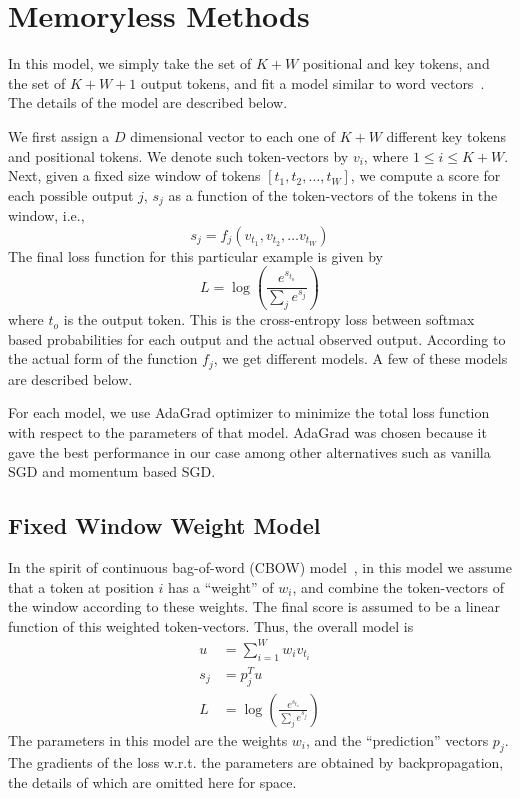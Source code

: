 \section{Memoryless Methods}
\label{sec:memoryless}

\noindent
In this model, we simply take the set of $K+W$ positional and key tokens, and
the set of $K+W+1$ output tokens, and fit a model similar to word
vectors~\cite{ref:mikolov:wvec}. The details of the model are described below.

We first assign a $D$ dimensional vector to each one of $K+W$ different key
tokens and positional tokens. We denote such token-vectors by $v_i$, where $1
\leq i \leq K+W$. Next, given a fixed size window of tokens $[t_1, t_2, \ldots,
t_W]$, we compute a score for each possible output $j$, $s_j$ as a function of
the token-vectors of the tokens in the window, i.e.,
\[
s_j = f_j\left(v_{t_1}, v_{t_2}, \ldots v_{t_W}\right)
\]
The final loss function for this particular example is given by 
\[
L = \log\left(\frac{e^{s_{t_o}}}{\sum_j{e^{s_j}}}\right)
\]
where $t_o$ is the output token. This is the cross-entropy loss
between softmax based probabilities for each output and the actual observed
output. According to the actual form of the function $f_j$, we get different
models. A few of these models are described below.

For each model, we use {\sc AdaGrad} optimizer to minimize the total loss
function with respect to the parameters of that model. {\sc AdaGrad} was chosen
because it gave the best performance in our case among other alternatives such
as vanilla SGD and momentum based SGD.

\subsection{Fixed Window Weight Model}
In the spirit of continuous bag-of-word (CBOW) model~\cite{ref:mikolov:wvec}, in
this model we assume that a token at position $i$ has a ``weight'' of $w_i$, and
combine the token-vectors of the window according to these weights. The final
score is assumed to be a linear function of this weighted token-vectors. Thus,
the overall model is
\begin{align}
u &= \sum_{i=1}^{W}{w_i v_{t_i}}\\
s_j &= p_j^Tu\\
L &= \log\left(\frac{e^{s_{t_o}}}{\sum_j{e^{s_j}}}\right)
\end{align}
The parameters in this model are the weights $w_i$, and the ``prediction''
vectors $p_j$. The gradients of the loss w.r.t. the parameters are obtained by
backpropagation, the details of which are omitted here for space.

